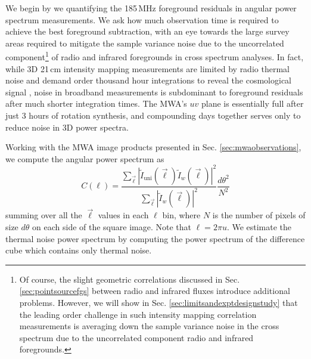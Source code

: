 \documentclass[numberedappendix]{emulateapj}
\begin{document}
We begin by we quantifying the 185\,MHz foreground residuals in angular power spectrum measurements. We ask how much observation time is required to achieve the best foreground subtraction, with an eye towards the large survey areas required to mitigate the sample variance noise due to the uncorrelated component\footnote{Of course, the slight geometric correlations discussed in Sec. \ref{sec:pointsourcefgs} between radio and infrared fluxes introduce additional problems. However, we will show in Sec. \ref{sec:limitsandexptdesignstudy} that the leading order challenge in such intensity mapping correlation measurements is averaging down the sample variance noise in the cross spectrum due to the uncorrelated component radio and infrared foregrounds.} of radio and infrared foregrounds in cross spectrum analyses. In fact, while 3D 21\,cm intensity mapping measurements are limited by radio thermal noise and demand order thousand hour integrations to reveal the cosmological signal \citep[e.g.][]{beardsley13,PoberNextGen}, noise in broadband measurements is subdominant to foreground residuals after much shorter integration times. The MWA's $uv$ plane is essentially full after just 3 hours of rotation synthesis, and compounding days together serves only to reduce noise in 3D power spectra. 

Working with the MWA image products presented in Sec. \ref{sec:mwaobservations}, we compute the angular power spectrum as
\begin{equation}
	C(\ell)=\frac{\sum_{\vec{\ell}}|\tilde{I}_\text{uni}(\vec{\ell})\tilde{I}_w(\vec{\ell})|^2}{\sum_{\vec{\ell}}|\tilde{I}_w(\vec{\ell})|^2}\frac{d\theta^2}{N^2}
\end{equation}
summing over all the $\vec{\ell}$ values in each $\ell$ bin, where $N$ is the number of pixels of size $d\theta$ on each side of the square image. Note that $\ell=2\pi u$. We estimate the thermal noise power spectrum by computing the power spectrum of the difference cube which contains only thermal noise.
\end{document}
